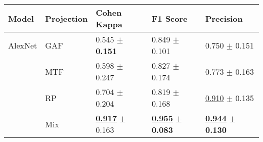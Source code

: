
\begin{tabular}{lllll}
\toprule
Model & Projection & Cohen Kappa & F1 Score & Precision \\
\midrule
AlexNet & GAF & \textcolor[rgb]{1.0000000000,0.0000000000,0}{0.545} $\pm$ \textbf{\textcolor[rgb]{0.0000000000,0.5000000000,0}{0.151}} & \textcolor[rgb]{0.7777777778,0.2222222222,0}{0.849} $\pm$ \textcolor[rgb]{0.1993959038,0.5000000000,0}{0.101} & \textcolor[rgb]{1.0000000000,0.0000000000,0}{0.750} $\pm$ \textcolor[rgb]{0.6349071673,0.3650928327,0}{0.151} \\
 & MTF & \textcolor[rgb]{0.8571428571,0.1428571429,0}{0.598} $\pm$ \textcolor[rgb]{1.0000000000,0.0000000000,0}{0.247} & \textcolor[rgb]{0.9425837321,0.0574162679,0}{0.827} $\pm$ \textcolor[rgb]{1.0000000000,0.0000000000,0}{0.174} & \textcolor[rgb]{0.8831168831,0.1168831169,0}{0.773} $\pm$ \textcolor[rgb]{1.0000000000,0.0000000000,0}{0.163} \\
 & RP & \textcolor[rgb]{0.5724489796,0.4275510204,0}{0.704} $\pm$ \textcolor[rgb]{0.5538521086,0.4461478914,0}{0.204} & \textcolor[rgb]{1.0000000000,0.0000000000,0}{0.819} $\pm$ \textcolor[rgb]{0.9283513413,0.0716486587,0}{0.168} & \underline{\textcolor[rgb]{0.1785714286,0.5000000000,0}{0.910}} $\pm$ \textcolor[rgb]{0.1620976255,0.5000000000,0}{0.135} \\
 & Mix & \underline{\textbf{\textcolor[rgb]{0.0000000000,0.5000000000,0}{0.917}}} $\pm$ \textcolor[rgb]{0.1259027269,0.5000000000,0}{0.163} & \underline{\textbf{\textcolor[rgb]{0.0000000000,0.5000000000,0}{0.955}}} $\pm$ \textbf{\textcolor[rgb]{0.0000000000,0.5000000000,0}{0.083}} & \underline{\textbf{\textcolor[rgb]{0.0000000000,0.5000000000,0}{0.944}}} $\pm$ \textbf{\textcolor[rgb]{0.0000000000,0.5000000000,0}{0.130}} \\
\bottomrule
\end{tabular}

